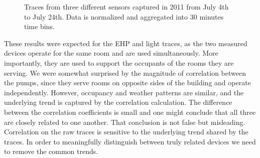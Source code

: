 \begin{figure}[t!]
\centering
 \caption{Traces from three different sensors captured in 2011 from July 4th to July 24th. Data is normalized and aggregated into 30 minutes time bins.}
 \label{fig:raw}
\end{figure}



These results were expected for the EHP and light traces, as the two measured devices operate for the same room 
and are used simultaneously.  More importantly, they are used to support the occupants of the rooms they are serving.
We were somewhat surprised by the magnitude of correlation between the pumps, since they serve rooms on
opposite sides of the building and operate independently.  However, occupancy and weather patterns are similar,
and the underlying trend is captured by the correlation calculation.
The difference between the correlation coefficients is small and one might conclude that all three are
closely related to one another.  That conclusion is not false but misleading.  Correlation on the raw 
traces is sensitive to the underlying trend shared by the traces.  In order to meaningfully distinguish between
truly related devices we need to remove the common trends.  


